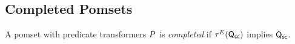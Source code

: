 

\subsection{Completed Pomsets}

\begin{definition}
  A pomset with predicate transformers $P$ is \emph{completed} if
  $\aTr{\aEvs}{\Q{\mSC}}$ implies $\mathsf{Q}_{{\mathsf{sc}}}$.
\end{definition}


